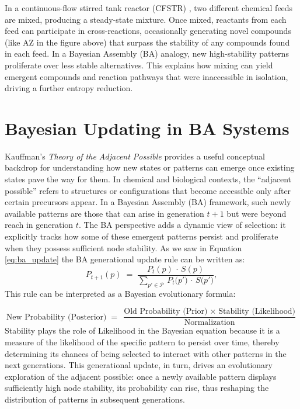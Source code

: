 \documentclass[entropy,article,submit,pdftex,moreauthors]{Definitions/mdpi}
\begin{document}
In a continuous-flow stirred tank reactor (CFSTR) \cite{fogler1999chemical}, two different chemical feeds are mixed, producing a steady-state mixture. Once mixed, reactants from each feed can participate in cross-reactions, occasionally generating novel compounds (like AZ in the figure above) that surpass the stability of any compounds found in each feed. In a Bayesian Assembly (BA) analogy, new high-stability patterns proliferate over less stable alternatives. This explains how mixing can yield emergent compounds and reaction pathways that were inaccessible in isolation, driving a further entropy reduction.

\section{Bayesian Updating in BA Systems}

Kauffman's \emph{Theory of the Adjacent Possible} \cite{kauffman2000investigations} provides a useful conceptual backdrop for understanding how new states or patterns can emerge once existing states pave the way for them. In chemical and biological contexts, the ``adjacent possible'' refers to structures or configurations that become accessible only after certain precursors appear. In a Bayesian Assembly (BA) framework, such newly available patterns are those that can arise in generation $t+1$ but were beyond reach in generation $t$. The BA perspective adds a dynamic view of selection: it explicitly tracks how some of these emergent patterns persist and proliferate when they possess sufficient node stability. As we saw in Equation \ref{eq:ba_update} the BA generational update rule can be written as:
\begin{equation}
P_{t+1}(p) \;=\; 
\frac{\,P_t(p)\,\cdot\,S(p)\,}
     {\sum_{p' \in \mathcal{P}}\,P_t\!\bigl(p'\bigr)\,\cdot\,S\!\bigl(p'\bigr)},
\end{equation} 
This rule can be interpreted as a Bayesian evolutionary formula:

\begin{equation}
\text{New Probability (Posterior)}
\;=\;
\frac{\text{Old Probability (Prior)} \;\times\; \text{Stability (Likelihood)}}
     {\text{Normalization}}
\end{equation}
Stability plays the role of Likelihood in the Bayesian equation because it is a measure of the likelihood of the specific pattern to persist over time, thereby determining its chances of being selected to interact with other patterns in the next generations. This generational update, in turn, drives an evolutionary exploration of the adjacent possible: once a newly available pattern displays sufficiently high node stability, its probability can rise, thus reshaping the distribution of patterns in subsequent generations.
\end{document}
